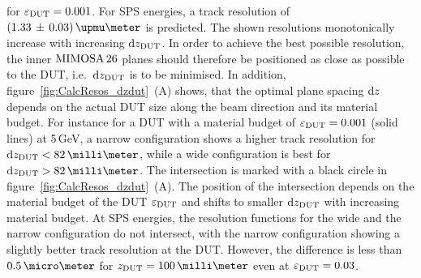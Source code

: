 \noindent
for $\mathnormal{\varepsilon_{\textrm{DUT}}} = 0.001$.
For SPS energies, a track resolution of $(1.33\,\pm\,0.03)\,\upmu\meter$ is predicted.
The shown resolutions monotonically increase with increasing $\textrm{d}z_{\textrm{DUT}}$. 
In order to achieve the best possible resolution, the inner $\textrm{MIMOSA\,26}$ planes should therefore be positioned as close as possible to the DUT, i.e.~$\textrm{d}z_{\textrm{DUT}}$ is to be minimised. 
In addition, figure~\ref{fig:CalcResos_dzdut}~(A) shows, that the optimal plane spacing $\textrm{d}z$ depends on the actual DUT size along the beam direction and its material budget.
For instance for a DUT with a material budget of $\mathnormal{\varepsilon_{\textrm{DUT}}} = 0.001$ (solid lines) at 5\,GeV, a narrow configuration shows a higher track resolution for $\dzdut < 82\,\milli\meter$,
 while a wide configuration is best for $\dzdut > 82\,\milli\meter$. %
The intersection is marked with a black circle in figure~\ref{fig:CalcResos_dzdut}~(A). 
The position of the intersection depends on the material budget of the DUT $\mathnormal{\varepsilon_{\textrm{DUT}}}$ and shifts to smaller $\textrm{d}z_{\textrm{DUT}}$ with increasing material budget. 
At SPS energies, the resolution functions for the wide and the narrow configuration do not intersect, with the narrow configuration showing a slightly better track resolution at the DUT. 
However, the difference is less than $0.5\,\micro\meter$ for $\zdut = 100\,\milli\meter$ even at $\mathnormal{\varepsilon_{\textrm{DUT}}} = 0.03$. 

% 
% 

